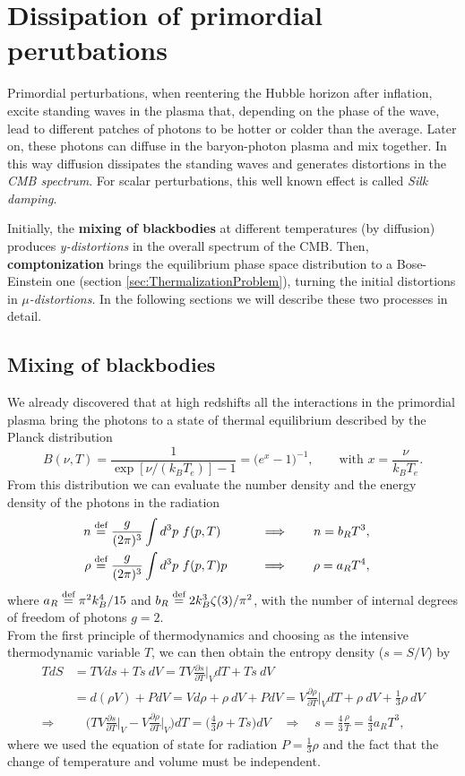 \section{Dissipation of primordial perutbations}
Primordial perturbations, when reentering the Hubble horizon after inflation, excite standing waves in the plasma that, depending on the phase of the wave, lead to different patches of photons to be hotter or colder than the average. Later on, these photons can diffuse in the baryon-photon plasma and mix together. In this way diffusion dissipates the standing waves and generates distortions in the \emph{CMB spectrum}. For scalar perturbations, this well known effect is called \emph{Silk damping}.

Initially, the \textbf{mixing of blackbodies} at different temperatures (by diffusion) produces \emph{y-distortions} in the overall spectrum of the CMB. Then, \textbf{comptonization} brings the equilibrium phase space distribution to a Bose-Einstein one (section \ref{sec:ThermalizationProblem}), turning the initial distortions in \emph{$\mu$-distortions}. In the following sections we will describe these two processes in detail.
\subsection{Mixing of blackbodies}\label{sec:MixingOfBlackbodies}
We already discovered that at high redshifts all the interactions in the primordial plasma bring the photons to a state of thermal equilibrium described by the Planck distribution
$$B(\nu,T)=\frac{1}{\exp[\nu/(k_BT_e)]-1}=\bigg(e^x-1\bigg)^{-1},\qquad \text{with }x=\frac{\nu}{k_BT_e}.$$
From this distribution we can evaluate the number density and the energy density of the photons in the radiation 
\begin{align*}
    n&\stackrel{\text{def}}{=} \frac{g}{(2\pi)^3}\int d^3p\ f(p,T) \qquad&\Longrightarrow\qquad n=b_RT^3,&&\\
    \rho&\stackrel{\text{def}}{=} \frac{g}{(2\pi)^3}\int d^3p\  f(p,T)p \qquad&\Longrightarrow\qquad \rho=a_RT^4,&&
\end{align*}
where $a_R\stackrel{\text{def}}{=}\pi^2k_B^4/15$ and $b_R\stackrel{\text{def}}{=} 2k_B^3\zeta(3)/\pi^2$, with the number of internal degrees of freedom of photons $g=2$.\\From the first principle of thermodynamics and choosing as the intensive thermodynamic variable $T$, we can then obtain the entropy density ($s=S/V$) by
\begin{align*}
    TdS&=TVds+Ts\ dV=TV\frac{\partial s}{\partial T}\bigg|_V dT+Ts\ dV\\&=d(\rho V)+PdV=Vd\rho+\rho\ dV+PdV=V\frac{\partial \rho}{\partial T}\bigg|_V dT+\rho\ dV+\frac{1}{3}\rho\ dV\\\Rightarrow& \quad \bigg(TV\frac{\partial s}{\partial T}\bigg|_V-V\frac{\partial \rho}{\partial T}\bigg|_V\bigg)dT=\bigg(\frac{4}{3}\rho+Ts\bigg)dV\quad\Rightarrow\quad \boxed{s=\frac{4}{3}\frac{\rho}{T}=\frac{4}{3}a_RT^3},
\end{align*}
where we used the equation of state for radiation $P=\frac{1}{3}\rho$ and the fact that the change of temperature and volume must be independent.

